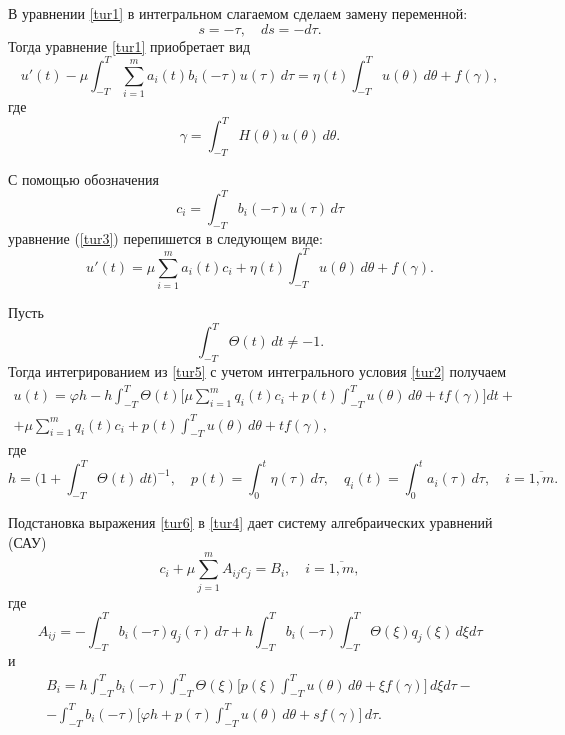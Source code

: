 
\smallskip
	
В уравнении \eqref{tur1} в интегральном слагаемом сделаем замену переменной: 
$$s=-\tau,\quad d s=-d \tau.$$ 
Тогда уравнение \eqref{tur1} приобретает вид
\begin{equation}
 u' (t) -\mu   \int _{-T}^T \sum \limits_{i=1}^{m} a_{i} (t)  b_{i} (-\tau)  u (\tau)  \, d \tau=\eta (t)  \int _{-T}^T u (\theta) \, d \theta+f (\gamma) , 
 \label{tur3}
\end{equation}
где $$\gamma= \int _{-T}^T  H (\theta)  u (\theta) \, d \theta .$$

С помощью обозначения 
\begin {equation}\label{tur4}
c_{i}= \int _{-T}^T b_{i} (-\tau)  u (\tau) \, d \tau
\end{equation}
уравнение (\ref{tur3}) перепишется в следующем виде:
\begin {equation}
\label{tur5}
 u' (t) =\mu  \sum \limits_{i=1}^{m} a_{i} (t)   c_{i}+\eta (t)  \int _{-T}^T u (\theta) \, d \theta+f (\gamma) .
\end{equation}
 
 Пусть 
 $$ \int _{-T}^T \Theta (t) \, d t \ne -1.$$ 
 Тогда	интегрированием из \eqref{tur5} с учетом интегрального условия 	\eqref{tur2} получаем 
\begin{multline}
u (t) =\varphi  h
-h  \int _{-T}^T \Theta (t) \biggl[ \mu  \sum \limits_{i=1}^{m} q_{i} (t)  c_{i}+p (t)  \int _{-T}^T u (\theta) \, d \theta+t  f (\gamma) \biggr] d t+
\\
+\mu  \sum \limits_{i=1}^{m} q_{i} (t)  c_{i}+p (t)  \int _{-T}^T u (\theta) \, d \theta+t  f (\gamma) , \label{tur6}
\end{multline}
где 
$$
h =\biggl( 1+ \int _{-T}^T \Theta (t) \, d t \biggr)^{ -1},\quad 
p (t)= \int _0^t \eta (\tau) \, d \tau , \quad    
q_{i} (t)= \int _0^t a_{i} (\tau) \, d \tau , \quad  i=\overline{1 , m} .$$
 
Подстановка выражения \eqref{tur6} в \eqref{tur4} дает систему алгебраических уравнений (САУ)
\begin {equation}\label{tur7}
c_{i}+\mu  \sum \limits_{j=1}^{m} A_{ i j}  c_{ j} =B_{i}  , \quad  i=\overline{1 , m} ,
\end{equation}
где
$$
A_{i j}=- \int _{-T}^T b_{i} (-\tau)  q_{j} (\tau) \, d \tau+
h   \int _{-T}^T b_{i} (-\tau)  \int _{-T}^T \Theta (\xi)  q_{ j} (\xi) \, d \xi  d \tau 
$$
и
\begin{multline}
B_{i}=h   \int _{-T}^T b_{i} (-\tau)  \int _{-T}^T \Theta (\xi) \biggl[ p (\xi)  \int _{-T}^T u (\theta) \, d \theta+\xi f (\gamma) \biggr] \, d \xi  d \tau-
\\
- \int _{-T}^T b_{i} (-\tau) \biggl[ \varphi  h+
p (\tau)   \int _{-T}^T u (\theta) \, d \theta+s  f (\gamma) \biggr] \, d \tau . 
\label{tur8}
\end{multline}
	
